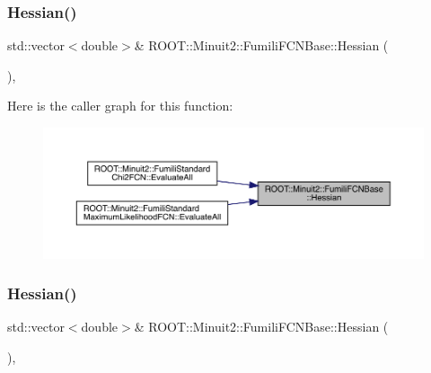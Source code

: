 \subsubsection{\texorpdfstring{Hessian()}{Hessian()}\hspace{0.1cm}{\footnotesize\ttfamily [3/4]}}
{\footnotesize\ttfamily std\+::vector$<$double$>$\& R\+O\+O\+T\+::\+Minuit2\+::\+Fumili\+F\+C\+N\+Base\+::\+Hessian (\begin{DoxyParamCaption}{ }\end{DoxyParamCaption})\hspace{0.3cm}{\ttfamily [inline]}, {\ttfamily [protected]}}

Here is the caller graph for this function\+:\nopagebreak
\begin{figure}[H]
\begin{center}
\leavevmode
\includegraphics[width=350pt]{de/dc5/classROOT_1_1Minuit2_1_1FumiliFCNBase_ac90c52050c1f7557834e3fa82c2657f3_icgraph}
\end{center}
\end{figure}
\mbox{\label{classROOT_1_1Minuit2_1_1FumiliFCNBase_ac90c52050c1f7557834e3fa82c2657f3}} 
\subsubsection{\texorpdfstring{Hessian()}{Hessian()}\hspace{0.1cm}{\footnotesize\ttfamily [4/4]}}
{\footnotesize\ttfamily std\+::vector$<$double$>$\& R\+O\+O\+T\+::\+Minuit2\+::\+Fumili\+F\+C\+N\+Base\+::\+Hessian (\begin{DoxyParamCaption}{ }\end{DoxyParamCaption})\hspace{0.3cm}{\ttfamily [inline]}, {\ttfamily [protected]}}

\mbox{\label{classROOT_1_1Minuit2_1_1FumiliFCNBase_a523d4811858adf42922499fa6c2bcdba}} 
